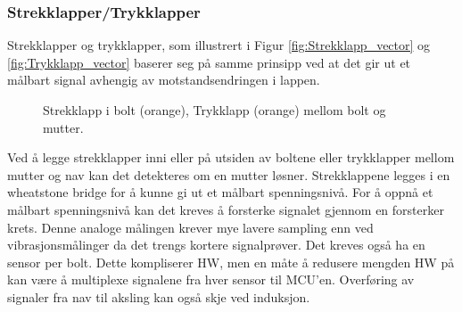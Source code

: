 \subsubsection{Strekklapper/Trykklapper}

Strekklapper og trykklapper, som illustrert i Figur \ref{fig:Strekklapp_vector} og \ref{fig:Trykklapp_vector} baserer seg på samme prinsipp ved at det gir ut et målbart signal avhengig av
motstandsendringen i lappen. 
\begin{figure}[H] \centering
{}
\hspace{3cm}
\caption{\protect{\ref{fig:Strekklapp_vector}} Strekklapp i bolt (orange), \protect{\ref{fig:Trykklapp_vector}} Trykklapp (orange) mellom bolt og mutter.}
\end{figure}
Ved å legge strekklapper inni eller på utsiden av boltene eller
trykklapper mellom mutter og nav kan det detekteres om en mutter løsner. Strekklappene
legges i en wheatstone bridge \cite{wheatstone} for å kunne gi ut et målbart
spenningsnivå. For å oppnå et målbart spenningsnivå kan det kreves å
forsterke signalet gjennom en forsterker krets. Denne analoge målingen krever mye lavere sampling enn ved
vibrasjonsmålinger da det trengs kortere signalprøver.
Det kreves også ha en sensor per bolt. Dette kompliserer HW, men en måte å redusere
mengden HW på kan være å multiplexe signalene fra hver sensor til MCU'en. 
Overføring av signaler fra nav til aksling kan også skje ved induksjon. 


